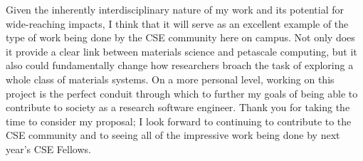 \documentclass[11pt]{article}
\begin{document}
Given the inherently interdisciplinary nature of my work and its potential for wide-reaching impacts, I think that it will serve as an excellent example of the type of work being done by the CSE community here on campus. Not only does it provide a clear link between materials science and petascale computing, but it also could fundamentally change how researchers broach the task of exploring a whole class of materials systems. On a more personal level, working on this project is the perfect conduit through which to further my goals of being able to contribute to society as a research software engineer. Thank you for taking the time to consider my proposal; I look forward to continuing to contribute to the CSE community and to seeing all of the impressive work being done by next year's CSE Fellows.



\end{document}
